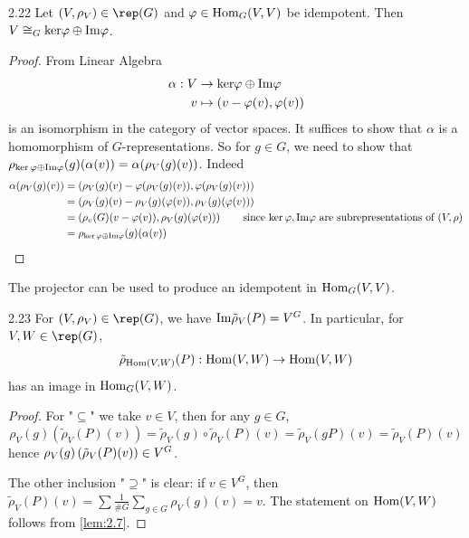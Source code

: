 \documentclass[twoside = false,	%
		headsepline,		%
		parskip = true,
		]{scrbook}						%
\begin{document}
    \begin{lemma}{}{2.22}
        Let $(V,\rho_V) \in \rep(G)$ and $\varphi\in\mathrm{Hom}_G(V,V)$ be idempotent. Then $V\cong_G\mathrm{ker}\varphi\oplus\mathrm{Im}\varphi$.
    \end{lemma}
    \begin{proof}
        From Linear Algebra \cite{LA}
        \begin{equation*}
        \begin{split}
            \alpha: V &\to \mathrm{ker}\varphi\oplus\mathrm{Im}\varphi \\
            v &\mapsto \left( v-\varphi(v), \varphi(v)\right)
        \end{split}
        \end{equation*}
        is an isomorphism in the category of vector spaces. It suffices to show that $\alpha$ is a homomorphism of $G$-representations. So for $g\in G$, we need to show that
        $\rho_{\ker\varphi\oplus\mathrm{Im}\varphi}(g)(\alpha(v))= \alpha(\rho_V(g)(v))$. 
        Indeed
        \begin{align*}
            \alpha(\rho_V(g)(v))&=\left( \rho_V(g)(v)-\varphi(\rho_V(g)(v)), \varphi(\rho_V(g)(v))\right)\\
            &=\left( \rho_V(g)(v)-\rho_V(g)(\varphi(v)), \rho_V(g)(\varphi(v))\right)\\
            &=\left( \rho_v(G)(v-\varphi(v)),\rho_V(g)(\varphi(v))\right)\qquad \text{since $\ker\varphi, \mathrm{Im}\varphi$ are subrepresentations of $(V,\rho)$}\\
            &= \rho_{\ker\varphi\oplus\mathrm{Im}\varphi}(g)(\alpha(v))
        \end{align*}
    \end{proof}

    The projector can be used to produce an idempotent in $\mathrm{Hom}_G(V,V)$.

    \begin{corollary}{}{2.23}
        For $(V,\rho_V) \in\rep(G)$, we have $\mathrm{Im}\tilde\rho_V(P)=V^G$.
        In particular, for $V,W\in\rep(G)$, 
        $$\tilde\rho_{\mathrm{Hom}(V,W)}(P): \mathrm{Hom}(V,W)\to \mathrm{Hom}(V,W)$$ has an image in $\mathrm{Hom}_G(V,W)$.
    \end{corollary}
    \begin{proof}
        For "$\subseteq$" we take $v\in V$, then for any $g\in G$,
        $$\rho_V(g)(\tilde\rho_V(P)(v)) = \tilde{\rho}_V(g) \circ \tilde{\rho}_V(P)(v) = \tilde\rho_V(gP)(v) = \tilde\rho_V(P)(v)$$
        hence $\rho_V(g)\left( \tilde\rho_V(P)(v)\right)\in V^G$.
        
        The other inclusion "$\supseteq$" is clear: if $v\in V^G$, then $\tilde\rho_V(P)(v)=\sum\frac1{\#G}\sum_{g\in G}\rho_V(g)(v)=v$.
        The statement on $\mathrm{Hom}(V,W)$ follows from \ref{lem:2.7}.
    \end{proof}
\end{document}
